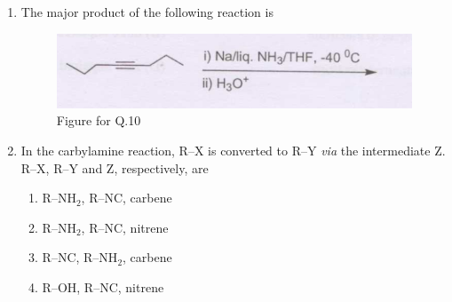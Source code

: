 \documentclass[12pt]{article}
\begin{document}
\begin{enumerate}
\item The major product of the following reaction is

\begin{figure}[H]
  \includegraphics[width=0.7\columnwidth]{figs/q10.png} 
  \caption{Figure for Q.10}
    \label{fig:q10}
      \end{figure}
\hfill{}


 

\item In the carbylamine reaction, R–X is converted to R–Y \textit{via} the intermediate Z.
R–X, R–Y and Z, respectively, are
\begin{enumerate}
    \item R–NH$_2$, R–NC, carbene
    \item R–NH$_2$, R–NC, nitrene
    \item R–NC, R–NH$_2$, carbene
    \item R–OH, R–NC, nitrene     \hfill{}
\end{enumerate}
    


\end{enumerate}
\end{document}
